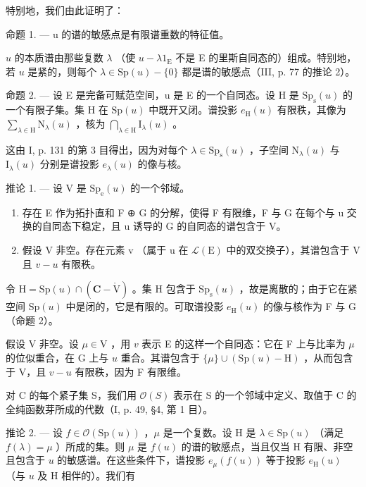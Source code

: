 特别地，我们由此证明了：

命题 1. --- u 的谱的敏感点是有限谱重数的特征值。

\(u\) 的本质谱由那些复数 \(\lambda\) （使 \(u - \lambda 1_{\mathrm{E}}\) 不是 E 的里斯自同态的）组成。特别地，若 \(u\) 是紧的，则每个 \(\lambda \in \mathrm{Sp}(u) - \{0\}\) 都是谱的敏感点（III, p. 77 的推论 2）。

命题 2. --- 设 E 是完备可赋范空间，u 是 E 的一个自同态。设 H 是 \(\mathrm{Sp}_{\mathrm{s}}(u)\) 的一个有限子集。集 H 在 \(\mathrm{Sp}(u)\) 中既开又闭。谱投影 \(e_{\mathrm{H}}(u)\) 有限秩，其像为 \(\sum_{\lambda \in \mathrm{H}}\mathrm{N}_{\lambda}(u)\) ，核为 \(\bigcap_{\lambda \in \mathrm{H}}\mathrm{I}_{\lambda}(u)\) 。

这由 I, p. 131 的第 3 目得出，因为对每个 \(\lambda \in \mathrm{Sp}_{\mathrm{s}}(u)\) ，子空间 \(\mathrm{N}_{\lambda}(u)\) 与 \(\mathrm{I}_{\lambda}(u)\) 分别是谱投影 \(e_{\lambda}(u)\) 的像与核。

推论 1. --- 设 V 是 \(\mathrm{Sp_e}(u)\) 的一个邻域。

\begin{enumerate}
\def\labelenumi{\alph{enumi})}
\item
  存在 E 作为拓扑直和 F ⊕ G 的分解，使得 F 有限维，F 与 G 在每个与 u 交换的自同态下稳定，且 u 诱导的 G 的自同态的谱包含于 V。
\item
  假设 V 非空。存在元素 v （属于 u 在 \(\mathcal{L}(\mathrm{E})\) 中的双交换子），其谱包含于 V 且 \(v - u\) 有限秩。
\end{enumerate}

令 \(\mathrm{H} = \mathrm{Sp}(u) \cap (\mathbf{C} - \mathring{\mathrm{V}})\) 。集 H 包含于 \(\mathrm{Sp}_{\mathrm{s}}(u)\) ，故是离散的；由于它在紧空间 \(\mathrm{Sp}(u)\) 中是闭的，它是有限的。可取谱投影 \(e_{\mathrm{H}}(u)\) 的像与核作为 F 与 G（命题 2）。

假设 V 非空。设 \(\mu\in\mathrm{V}\) ，用 \(v\) 表示 E 的这样一个自同态：它在 F 上与比率为 \(\mu\) 的位似重合，在 G 上与 \(u\) 重合。其谱包含于 \(\{\mu\}\cup(\mathrm{Sp}(u)-\mathrm{H})\) ，从而包含于 V，且 \(v-u\) 有限秩，因为 F 有限维。

对 C 的每个紧子集 S，我们用 \(\mathcal{O}(S)\) 表示在 S 的一个邻域中定义、取值于 C 的全纯函数芽所成的代数（I, p. 49, §4, 第 1 目）。

推论 2. --- 设 \(f \in \mathcal{O}(\mathrm{Sp}(u))\) ，\(\mu\) 是一个复数。设 H 是 \(\lambda \in \mathrm{Sp}(u)\) （满足 \(f(\lambda) = \mu\) ）所成的集。则 \(\mu\) 是 \(f(u)\) 的谱的敏感点，当且仅当 H 有限、非空且包含于 \(u\) 的敏感谱。在这些条件下，谱投影 \(e_{\mu}(f(u))\) 等于投影 \(e_{\mathrm{H}}(u)\) （与 \(u\) 及 H 相伴的）。我们有

